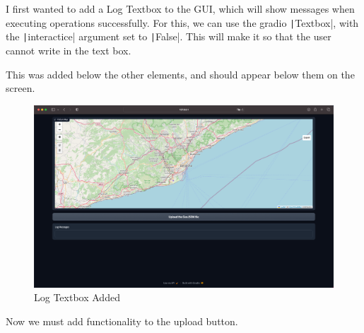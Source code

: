 \documentclass[12pt]{report}
\newcommand{\pil}[1]{\protect\texttt|#1|}
\begin{document}
I first wanted to add a Log Textbox to the GUI, which will show messages when executing operations successfully. For this, we can use the gradio \pil{Textbox}, with the \pil{interactice} argument set to \pil{False}. This will make it so that the user cannot write in the text box.

This was added below the other elements, and should appear below them on the screen.

\begin{figure}[H]
\centering
\includegraphics[width=14cm]{ss12.1.png}
\caption{Log Textbox Added}\label{fig:ss12.1}
\end{figure}

\begin{center}
\end{center}

Now we must add functionality to the upload button.
\end{document}
